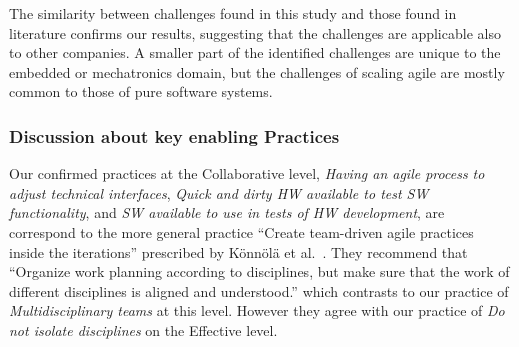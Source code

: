\documentclass[10pt,a4paper]{IEEEtran} %
\begin{document}
\begin{comment}
Limitations: ``This is in stark contrast to the fact that companies report using these frameworks, e.g., according to Version One’s 10th survey on the state of agile 23\% of respondents reported using SAFe and 4\% LeSS. Thus, it would be important to study the scaling frameworks scientifically: How much are these scaling frameworks used? How are they used? What are the benefits and challenges of using them? To what kind of circumstances is each of them suitable? How much are they tailored in practice to the needs of the customers?''

In our XP-paper we did not look into enabling factors but took a look at benefits and challenges; should we derive enablers therefrom? Should we take our Dos and Don'ts list for such enablers to compare the other study with?
\end{comment}

\begin{comment}
Turk et al. 2002: \url{https://www4.in.tum.de/publ/papers/XP02.Limitations.pdf}
Dan Turk, Robert France, and Bernhard Rumpe: Limitations of agile Software Processes \cite{}
Table from \cite{veneziano_when_2014} is also based on the one mentioned in the comment.

``A Maturity Model for Scaling agile Development'' (\url{http://ieeexplore.ieee.org/xpls/abs_all.jsp?arnumber=7302487&tag=1})
\cite{stojanov_maturity_2015}
\end{comment}





The similarity between challenges found in this study and those found in literature
confirms our results, suggesting that the challenges are applicable also to other companies.
A smaller part of the identified challenges are unique to the embedded or mechatronics domain, but the challenges of scaling agile are mostly common to those of pure software systems.

\subsubsection{Discussion about key enabling Practices}
Our confirmed practices at the Collaborative level,
\emph{Having an agile process to adjust technical interfaces}, 
\emph{Quick and dirty HW available to test SW functionality}, and
\emph{SW available to use in tests of HW development}, are correspond to the more general practice ``Create team-driven agile practices inside the iterations'' prescribed by Könnölä et al.~\cite{konnola_agile_2016}. They recommend that ``Organize work planning according to disciplines, but make sure that the work of different disciplines is aligned and understood.'' which contrasts to our practice of \emph{Multidisciplinary teams} at this level. However they agree with our practice of \emph{Do not isolate disciplines} on the Effective level.
\end{document}
